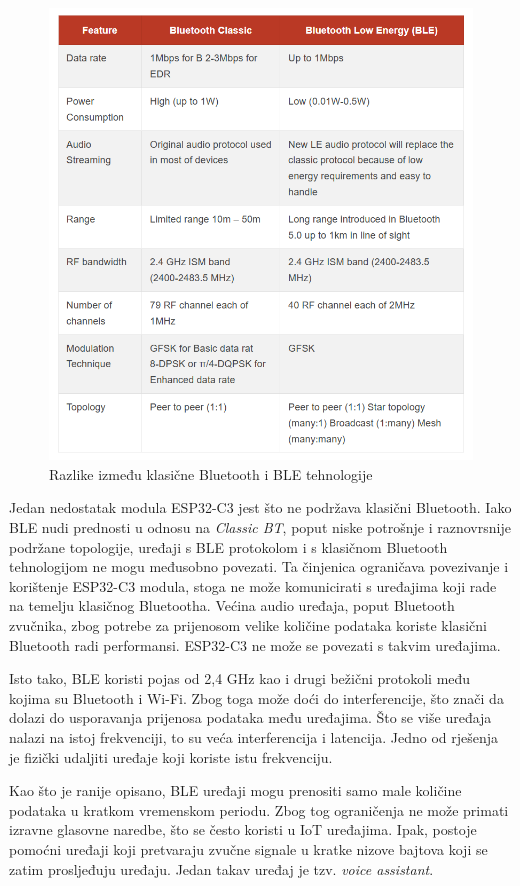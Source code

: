 \begin{figure}[ht]
	\centering
	\includegraphics[scale=0.6]{imgs/blevsbt}
	\caption{Razlike između klasične Bluetooth i BLE tehnologije \cite{blevsbt}}
	\label{fig:blevsbt}
\end{figure}

Jedan nedostatak modula ESP32-C3 jest što ne podržava klasični Bluetooth. Iako BLE nudi prednosti u odnosu na \textit{Classic BT}, poput niske potrošnje i raznovrsnije podržane topologije, uređaji s BLE protokolom i s klasičnom Bluetooth tehnologijom ne mogu međusobno povezati. Ta činjenica ograničava povezivanje i korištenje ESP32-C3 modula, stoga ne može komunicirati s uređajima koji rade na temelju klasičnog Bluetootha. Većina audio uređaja, poput Bluetooth zvučnika, zbog potrebe za prijenosom velike količine podataka koriste klasični Bluetooth radi performansi. ESP32-C3 ne može se povezati s takvim uređajima.

Isto tako, BLE koristi pojas od 2,4 GHz kao i drugi bežični protokoli među kojima su Bluetooth i Wi-Fi. Zbog toga može doći do interferencije, što znači da dolazi do usporavanja prijenosa podataka među uređajima. Što se više uređaja nalazi na istoj frekvenciji, to su veća interferencija i latencija. Jedno od rješenja je fizički udaljiti uređaje koji koriste istu frekvenciju. \cite{limit_bt}

Kao što je ranije opisano, BLE uređaji mogu prenositi samo male količine podataka u kratkom vremenskom periodu.  Zbog tog ograničenja ne može primati izravne glasovne naredbe, što se često koristi u IoT uređajima. Ipak, postoje pomoćni uređaji koji pretvaraju zvučne signale u kratke nizove bajtova koji se zatim prosljeđuju uređaju. Jedan takav uređaj je tzv. \textit{voice assistant}.


\eject